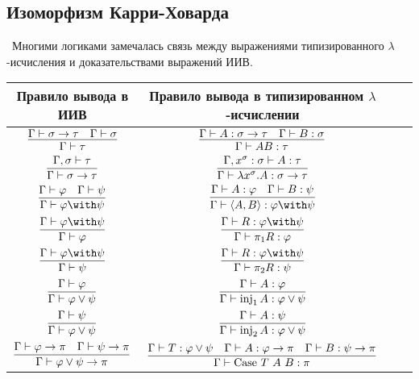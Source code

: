 \subsection{\texorpdfstring{Изоморфизм Карри-Ховарда}{Curry-style}}

\todo \ Многими логиками замечалась связь между выражениями типизированного $\lambda$-исчисления и доказательствами выражений ИИВ.

\begin{center}
\begin{tabular}{|Sc|Sc|} \hline
    Правило вывода в ИИВ & Правило вывода в типизированном $\lambda$-исчислении \\ \hline

    $\infer{\Gamma \vdash \tau}{\Gamma \vdash \sigma \rightarrow \tau & \Gamma \vdash \sigma}$ &
    $\infer{\Gamma \vdash AB : \tau}{\Gamma \vdash A : \sigma \rightarrow \tau & \Gamma \vdash B : \sigma}$ \\

    $\infer{\Gamma \vdash \sigma \rightarrow \tau}{\Gamma, \sigma \vdash \tau}$ &
    $\infer{\Gamma \vdash \lambda x^\sigma . A : \sigma \rightarrow \tau}{\Gamma, x^\sigma : \sigma \vdash A : \tau}$ \\ \hline

    $\infer{\Gamma \vdash \varphi \with \psi}{\Gamma \vdash \varphi & \Gamma \vdash \psi}$ &
    $\infer{\Gamma \vdash \left<A,B\right> : \varphi \with \psi}{\Gamma \vdash A : \varphi & \Gamma \vdash B : \psi}$ \\

    $\infer{\Gamma \vdash \varphi}{\Gamma \vdash \varphi \with \psi}$ &
    $\infer{\Gamma \vdash \pi_1 R : \varphi}{\Gamma \vdash R : \varphi \with \psi}$ \\

    $\infer{\Gamma \vdash \psi}{\Gamma \vdash \varphi \with \psi}$ &
    $\infer{\Gamma \vdash \pi_2 R : \psi}{\Gamma \vdash R : \varphi \with \psi}$ \\ \hline

    $\infer{\Gamma \vdash \varphi \vee \psi}{\Gamma \vdash \varphi}$ &
    $\infer{\Gamma \vdash \inj_1 A : \varphi \vee \psi}{\Gamma \vdash A : \varphi}$ \\

    $\infer{\Gamma \vdash \varphi \vee \psi}{\Gamma \vdash \psi}$ &
    $\infer{\Gamma \vdash \inj_2 A : \varphi \vee \psi}{\Gamma \vdash A : \psi}$ \\

    $\infer{\Gamma \vdash \varphi \vee \psi \rightarrow \pi}
        {\Gamma \vdash \varphi \rightarrow \pi & \Gamma \vdash \psi \rightarrow \pi}$ &
    $\infer{\Gamma \vdash \case{T}{A}{B} : \pi}{\Gamma \vdash T : \varphi \vee \psi &
        \Gamma \vdash A : \varphi \rightarrow \pi & \Gamma \vdash B : \psi \rightarrow \pi}$ \\ \hline
\end{tabular}
\end{center}

